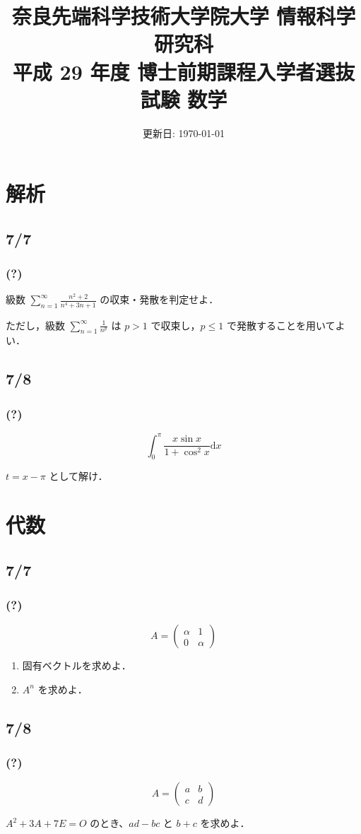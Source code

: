 \documentclass[12pt, dvipdfmx, a4paper]{jsarticle}
\title{
  奈良先端科学技術大学院大学 情報科学研究科 \\
  平成 29 年度 博士前期課程入学者選抜試験 数学
}
\date{更新日: \today}
\begin{document}
\maketitle

\section*{解析}
\subsection*{7/7}
\subsubsection*{(?)}
級数 $\sum_{n = 1}^\infty \frac{n^2 + 2}{n^4 + 3n + 1}$ の収束・発散を判定せよ．

ただし，級数 $\sum_{n = 1}^\infty \frac{1}{n^p}$ は
$p > 1$ で収束し，$p \leq 1$ で発散することを用いてよい．

\subsection*{7/8}
\subsubsection*{(?)}
\[
  \int_0^\pi \frac{x \sin x}{1 + \cos^2 x}　\mathrm{d}x
\]

$t = x - \pi$ として解け．


\section*{代数}
\subsection*{7/7}
\subsubsection*{(?)}

\[
  A = \begin{pmatrix} \alpha & 1 \\ 0 & \alpha \end{pmatrix}
\]

\begin{enumerate}
  \item 固有ベクトルを求めよ．
  \item $A^n$ を求めよ．
\end{enumerate}

\subsection*{7/8}
\subsubsection*{(?)}
\[
  A = \begin{pmatrix} a & b \\ c & d \end{pmatrix}
\]

$A^2 + 3A + 7E = O$ のとき、$ad - bc$ と $b + c$ を求めよ．
\end{document}
